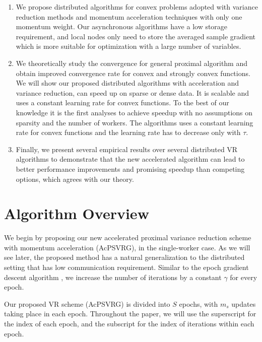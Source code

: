 \documentclass{article}
\theoremstyle{definition}
\theoremstyle{remark}
\begin{document}
\begin{enumerate}
    
\item We propose distributed algorithms for convex problems adopted with variance reduction methods and momentum acceleration techniques with only one momentum weight. Our asynchronous  algorithms have a low storage requirement, and local nodes only need to store the averaged sample gradient which is more suitable for optimization with a
large number of variables. 

\item We theoretically study the convergence for general proximal algorithm and obtain improved convergence rate for convex and strongly convex functions. We will show our proposed distributed algorithms with acceleration and variance reduction, can speed up on sparse or dense data. It is scalable and uses a constant learning rate for convex functions. To the best of our knowledge it is the first analyses to achieve speedup with no assumptions on sparsity and the number of workers. The algorithms uses a constant learning rate for convex functions and the learning rate has to decrease only with $\tau$. 
 
\item Finally, we present several empirical results over several distributed VR algorithms to demonstrate that the new accelerated algorithm 
can lead to better performance improvements and promising speedup than competing options, which agrees with our theory. 
\end{enumerate}

\section{{Algorithm Overview}}

We begin by proposing our new accelerated proximal variance reduction scheme with momentum acceleration (AcPSVRG), in the single-worker case. 
As we will see later, the proposed method has a natural generalization to the distributed setting that has low communication requirement. Similar to the epoch gradient descent algorithm \cite{Hazan2011}, we increase the number of iterations by a constant $\gamma$ for every epoch. 

Our proposed VR scheme (AcPSVRG) is divided into $S$ epochs, with $m_s$ updates taking place in each epoch.  Throughout the paper, we will
use the superscript for the index of each epoch, and the subscript for the index of iterations within each epoch.
\end{document}

